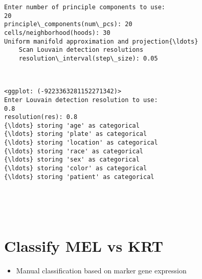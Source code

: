 \documentclass[11pt]{article}
\providecommand{\tightlist}{%
      \setlength{\itemsep}{0pt}\setlength{\parskip}{0pt}}
\begin{document}
    \begin{Verbatim}[commandchars=\\\{\}]
Enter number of principle components to use:
20
principle\_components(num\_pcs): 20
cells/neighborhood(hoods): 30
Uniform manifold approximation and projection{\ldots}
	Scan Louvain detection resolutions
	resolution\_interval(step\_size): 0.05

    \end{Verbatim}

    \begin{center}
    \end{center}
    { \hspace*{\fill} \\}
    
    \begin{Verbatim}[commandchars=\\\{\}]
<ggplot: (-9223363281152271342)>
Enter Louvain detection resolution to use:
0.8
resolution(res): 0.8
{\ldots} storing 'age' as categorical
{\ldots} storing 'plate' as categorical
{\ldots} storing 'location' as categorical
{\ldots} storing 'race' as categorical
{\ldots} storing 'sex' as categorical
{\ldots} storing 'color' as categorical
{\ldots} storing 'patient' as categorical

    \end{Verbatim}

    \begin{center}
    \end{center}
    { \hspace*{\fill} \\}
    
    \begin{center}
    \end{center}
    { \hspace*{\fill} \\}
    
    \section{Classify MEL vs KRT}\label{classify-mel-vs-krt}

\begin{itemize}
\tightlist
\item
  Manual classification based on marker gene expression
\end{itemize}
\end{document}
